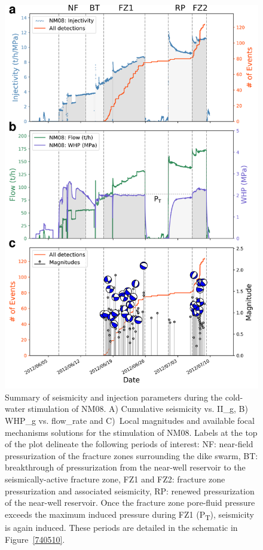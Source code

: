 \begin{figure}[p]
\begin{center}
\includegraphics[width=0.79\columnwidth]{Chapter_3_Nga/figures/Multiplet_95_vs_flow_rate/Full_final_cat_flow_WHP_mags_FMs_diffusion_NM08_Stim_II_11-7_GrowClust_no_diffs_lines_gray_labels_12-5}
\caption[Seismicity and injection parameters during NM08 stimulation]{{
Summary of seismicity and injection parameters during the cold-water
\gls{stimulation} of NM08. A) Cumulative seismicity vs. \gls{II_g}, B)
\gls{WHP_g} vs. \gls{flow_rate} and C)~Local magnitudes and available
focal mechanisms solutions for the \gls{stimulation} of NM08. Labels at the
top of the plot delineate the following periods of interest: NF:
near-field pressurization of the fracture zones surrounding the dike
swarm, BT: breakthrough of pressurization from the near-well reservoir
to the seismically-active fracture zone, FZ1 and FZ2: fracture zone
pressurization and associated seismicity, RP: renewed pressurization of
the near-well reservoir. Once the fracture zone pore-fluid pressure
exceeds the maximum induced pressure during FZ1 (P\textsubscript{T}),
seismicity is again induced. These periods are detailed in the schematic
in Figure~{\ref{740510}}.
{\label{645772}}%
}}
\end{center}
\end{figure}

